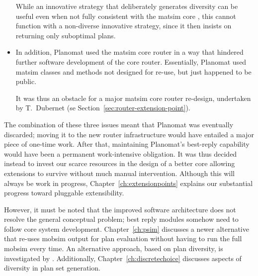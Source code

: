 \begin{itemize}
While an innovative strategy that deliberately generates diversity can be useful even when not fully consistent with the \gls{matsim} core \citep{NagelKickhoeferJoubert2014HeterogeneousVoTsPROCEDIA}, this cannot function with a non-diverse innovative strategy, since it then insists on returning only suboptimal plans.
%
\item In addition, Planomat used the \gls{matsim} core router in a way that hindered further software development of the core router. Essentially, Planomat used \gls{matsim} classes and methods not designed for re-use, but just happened to be public.

It was thus an obstacle for a major \gls{matsim} core router re-design, undertaken by T.~Dubernet (se Section~\ref{sec:router-extension-point}).
\end{itemize}

The combination of these three issues meant that Planomat was eventually discarded; moving it to the new router infrastructure would have entailed a major piece of one-time work. After that, maintaining Planomat's best-reply capability would have been a permanent work-intensive obligation. It was thus decided instead to invest our scarce resources in the design of a better core allowing extensions to survive without much manual intervention. Although this will always be work in progress, Chapter~\ref{ch:extensionpoints} explains our substantial progress toward pluggable extensibility.

However, it must be noted that the improved software architecture does not resolve the general conceptual problem; best reply modules somehow need to follow core system development. Chapter~\ref{ch:psim} discusses a newer alternative that re-uses \gls{mobsim} output for plan evaluation without having to run the full \gls{mobsim} every time. An alternative approach, based on plan diversity, is investigated by \cite{NagelKickhoeferJoubert2014HeterogeneousVoTsPROCEDIA}. Additionally, Chapter~\ref{ch:discretechoice} discusses aspects of diversity in plan set generation.


